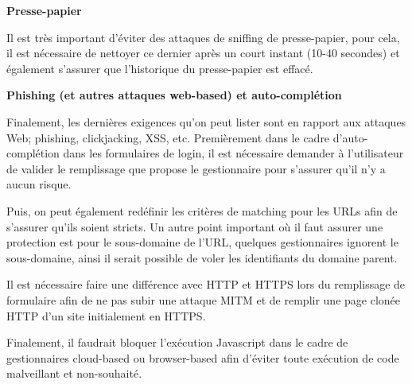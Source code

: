 \textbf{Presse-papier}

Il est très important d'éviter des attaques de sniffing de presse-papier, pour cela, il est nécessaire de nettoyer ce dernier après un court instant (10-40 secondes) et également s'assurer que l'historique du presse-papier est effacé.

\textbf{Phishing (et autres attaques web-based) et auto-complétion}

Finalement, les dernières exigences qu'on peut lister sont en rapport aux attaques Web; phishing, clickjacking, XSS, etc. Premièrement dans le cadre d'auto-complétion dans les formulaires de login, il est nécessaire demander à l'utilisateur de valider le remplissage que propose le gestionnaire pour s'assurer qu'il n'y a aucun risque. 

Puis, on peut également redéfinir les critères de matching pour les URLs afin de s'assurer qu'ils soient stricts. Un autre point important où il faut assurer une protection est pour le sous-domaine de l'URL, quelques gestionnaires ignorent le sous-domaine, ainsi il serait possible de voler les identifiants du domaine parent. 

Il est nécessaire faire une différence avec HTTP et HTTPS lors du remplissage de formulaire afin de ne pas subir une attaque MITM et de remplir une page clonée HTTP d'un site initialement en HTTPS. 

Finalement, il faudrait bloquer l'exécution Javascript dans le cadre de gestionnaires cloud-based ou browser-based afin d'éviter toute exécution de code malveillant et non-souhaité.
